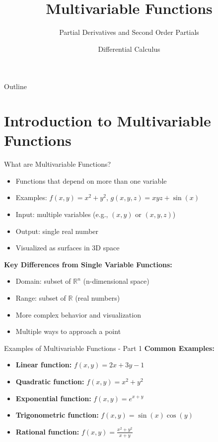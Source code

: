 \documentclass[aspectratio=169]{beamer}
\title{Multivariable Functions}
\subtitle{Partial Derivatives and Second Order Partials}
\author{Differential Calculus}
\date{}
\begin{document}
\begin{frame}
\titlepage
\end{frame}

\begin{frame}{Outline}
\tableofcontents
\end{frame}

\section{Introduction to Multivariable Functions}

\begin{frame}{What are Multivariable Functions?}
\begin{itemize}
    \item Functions that depend on more than one variable
    \item Examples: $f(x,y) = x^2 + y^2$, $g(x,y,z) = xyz + \sin(x)$
    \item Input: multiple variables (e.g., $(x,y)$ or $(x,y,z)$)
    \item Output: single real number
    \item Visualized as surfaces in 3D space
\end{itemize}

\textbf{Key Differences from Single Variable Functions:}
\begin{itemize}
    \item Domain: subset of $\mathbb{R}^n$ (n-dimensional space)
    \item Range: subset of $\mathbb{R}$ (real numbers)
    \item More complex behavior and visualization
    \item Multiple ways to approach a point
\end{itemize}
\end{frame}

\begin{frame}{Examples of Multivariable Functions - Part 1}
\textbf{Common Examples:}
\begin{itemize}
    \item \textbf{Linear function:} $f(x,y) = 2x + 3y - 1$
    \item \textbf{Quadratic function:} $f(x,y) = x^2 + y^2$
    \item \textbf{Exponential function:} $f(x,y) = e^{x+y}$
    \item \textbf{Trigonometric function:} $f(x,y) = \sin(x) \cos(y)$
    \item \textbf{Rational function:} $f(x,y) = \frac{x^2 + y^2}{x + y}$
\end{itemize}
\end{frame}
\end{document}
